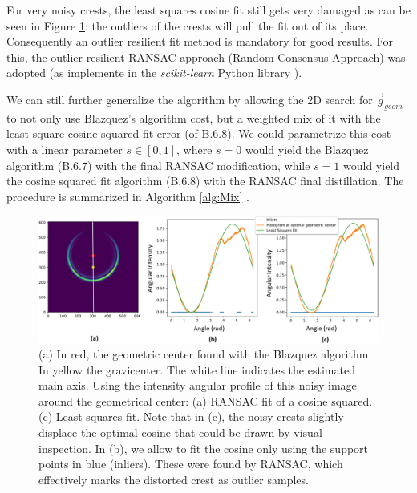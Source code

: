 \documentclass[11pt, a4paper, twoside]{article} %
\begin{document}
For very noisy crests, the least squares cosine fit still gets very damaged as can be seen in Figure \ref{fig:ransac}: the outliers of the crests will pull the fit out of its place. Consequently an outlier resilient fit method is mandatory for good results. For this, the outlier resilient RANSAC approach (Random Consensus Approach) \cite{RANSAC} was adopted (as implemente in the {\em scikit-learn} Python library \cite{sklearn}). \vspace{-0.05cm}


We can still further generalize the algorithm by allowing the 2D search for $\vec{g}_{geom}$ to not only use Blazquez's algorithm cost, but a weighted mix of it with the least-square cosine squared fit error (of B.6.8). We could parametrize this cost with a linear parameter $s\in[0,1]$, where $s=0$ would yield the Blazquez algorithm (B.6.7) with the final RANSAC modification, while $s=1$ would yield the cosine squared fit algorithm (B.6.8) with the RANSAC final distillation. The procedure is summarized in Algorithm \ref{alg:Mix} .

\begin{figure}[h!] 
     \centering 
    \includegraphics[width=0.8\linewidth]{histo.PNG}
    \caption{ (a) In red, the geometric center found with the Blazquez algorithm. In yellow the gravicenter. The white line indicates the estimated main axis. Using the intensity angular profile of this noisy image around the geometrical center: (a) RANSAC fit of a cosine squared. (c) Least squares fit. Note that in (c), the noisy crests slightly displace the optimal cosine that could be drawn by visual inspection. In (b), we allow to fit the cosine only using the support points in blue (inliers). These were found by RANSAC, which effectively marks the distorted crest as outlier samples.}
    \label{fig:ransac}
\end{figure}
\end{document}
